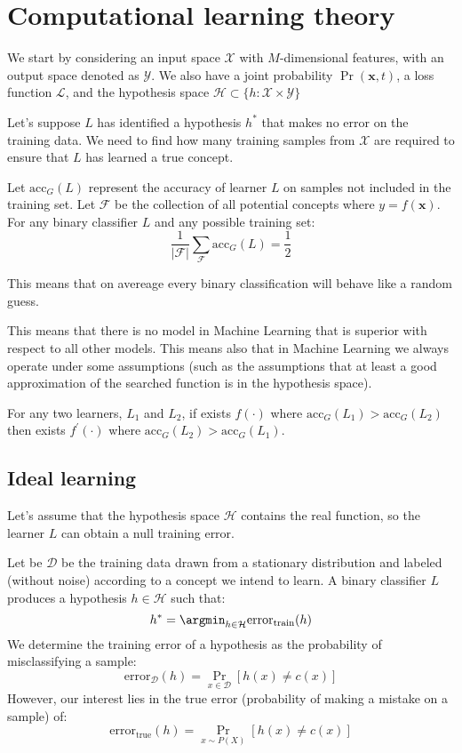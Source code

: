 \section{Computational learning theory}

We start by considering an input space $\mathcal{X}$ with $M$-dimensional features, with an output space denoted as $\mathcal{Y}$. 
We also have a joint probability $\Pr(\mathbf{x},t)$, a loss function $\mathcal{L}$, and the hypothesis space $\mathcal{H}\subset\{h:\mathcal{X}\times\mathcal{Y}\}$

Let's suppose $L$ has identified a hypothesis $h^\ast$ that makes no error on the training data. 
We need to find how many training samples from $\mathcal{X}$ are required to ensure that $L$ has learned a true concept. 
\begin{theorem}
    Let $\text{acc}_G(L)$ represent the accuracy of learner $L$ on samples not included in the training set.
    Let $\mathcal{F}$ be the collection of all potential concepts where $y=f(\mathbf{x})$.
    For any binary classifier $L$ and any possible training set:
    \[\dfrac{1}{\left\lvert \mathcal{F} \right\rvert}\sum_{\mathcal{F}}\text{acc}_G(L)=\dfrac{1}{2}\]
\end{theorem}
This means that on avereage every binary classification will behave like a random guess.

This means that there is no model in Machine Learning that is superior with respect to all other models. 
This means also that in Machine Learning we always operate under some assumptions (such as the assumptions that at least a good approximation of the searched function is in the hypothesis space). 
\begin{corollary}
    For any two learners, $L_1$ and $L_2$, if exists $f(\cdot)$ where $\text{acc}_G(L_1)>\text{acc}_G(L_2)$ then exists $f^\prime(\cdot)$ where $\text{acc}_G(L_2)>\text{acc}_G(L_1)$. 
\end{corollary}

\subsection{Ideal learning}
Let's assume that the hypothesis space $\mathcal{H}$ contains the real function, so the learner $L$ can obtain a null training error.

Let be $\mathcal{D}$ be the training data drawn from a stationary distribution and labeled (without noise) according to a concept we intend to learn.
A binary classifier $L$ produces a hypothesis $h \in \mathcal{H}$ such that: 
\[h^\ast=\argmin_{h\in \mathcal{H}}\text{error}_{\text{train}}(h)\]
We determine the training error of a hypothesis as the probability of misclassifying a sample:
\[\text{error}_{\mathcal{D}}(h)=\Pr_{x \in \mathcal{D}}\left[h(x)\neq c(x)\right]\]
However, our interest lies in the true error (probability of making a mistake on a sample) of:
\[\text{error}_{\text{true}}(h)=\Pr_{x \sim P(X)}\left[h(x)\neq c(x)\right]\]

